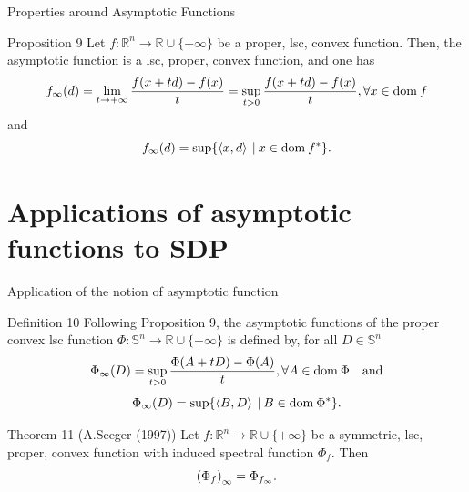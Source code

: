 \documentclass[aspectratio=169, dvipdfmx, 11pt]{beamer}
\newcommand{\RealNumberSet}{\mathbb{R}}
\newcommand{\NDemenstionalRealEuclideanSpace}{\mathbb{R}^n}
\newcommand{\NDemenstionalRealSymmetricMatrixSpace}{\mathbb{S}^n}
\newcommand{\Domain}[1]{\text{\rm dom\:${#1}$}} %
\newcommand{\InnerProduct}[2]{\left\langle {#1},{#2}\right\rangle} %
\newcommand{\ExtendedRealValuedFunction}[2]{{#1}: {#2} \to \RealNumberSet \cup \{+\infty\}}
\newcommand{\ConjugateFunction}[1]{{#1}^*}
\begin{document}
\begin{frame}{Properties around Asymptotic Functions}
  \begin{block}{Proposition 9}
    Let $\ExtendedRealValuedFunction{f}{\NDemenstionalRealEuclideanSpace}$ be a proper, lsc, convex function. Then, the asymptotic function is a lsc, proper, convex function, and one has
    \begin{equation}
      f_{\infty} (d) = \lim_{t \to +\infty} \frac{f(x+td) -f(x)}{t} = \sup_{t > 0} \frac{f(x+td) -f(x)}{t}, \forall x \in \Domain{f} \notag
    \end{equation}
    and
    \begin{equation}
      f_{\infty} (d) = \sup \{\InnerProduct{x}{d} \:|\: x \in \Domain{\ConjugateFunction{f}}\}. \notag
    \end{equation}
  \end{block}
\end{frame}

\section{Applications of asymptotic functions to SDP}

\begin{frame}{Application of the notion of asymptotic function}
  \begin{block}{Definition 10}
    Following Proposition 9, the asymptotic functions of the proper convex lsc function $\ExtendedRealValuedFunction{\Phi}{\NDemenstionalRealSymmetricMatrixSpace}$ is defined by, for all $D \in \NDemenstionalRealSymmetricMatrixSpace$
    \begin{equation}
      \Phi_{\infty} (D) = \sup_{t > 0} \frac{\Phi(A+tD) -\Phi(A)}{t}, \forall A \in \Domain{\Phi} \quad \text{and}\notag
    \end{equation}
    \begin{equation}
      \Phi_{\infty} (D) = \sup \{\InnerProduct{B}{D} \:|\: B \in \Domain{\ConjugateFunction{\Phi}}\}. \notag
    \end{equation}
  \end{block}

  \begin{block}{Theorem 11 (A.Seeger (1997))}
    Let $\ExtendedRealValuedFunction{f}{\NDemenstionalRealEuclideanSpace}$ be a symmetric, lsc, proper, convex function with induced spectral function $\Phi_{f}$. Then
    \begin{equation}
      {(\Phi_{f})}_{\infty} = \Phi_{f_{\infty}}. \notag
    \end{equation}
  \end{block}
\end{frame}
\end{document}
